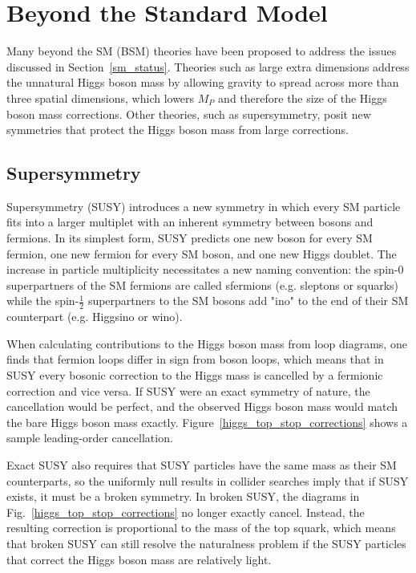 \section{Beyond the Standard Model}
Many beyond the SM (BSM) theories have been proposed to address the issues discussed in Section~\ref{sm_status}. Theories such as large extra dimensions address the unnatural Higgs boson mass by allowing gravity to spread across more than three spatial dimensions, which lowers $M_P$ and therefore the size of the Higgs boson mass corrections. Other theories, such as supersymmetry, posit new symmetries that protect the Higgs boson mass from large corrections. 

\subsection{Supersymmetry}
Supersymmetry (SUSY) introduces a new symmetry in which every SM particle fits into a larger multiplet with an inherent symmetry between bosons and fermions. In its simplest form, SUSY predicts one new boson for every SM fermion, one new fermion for every SM boson, and one new Higgs doublet. The increase in particle multiplicity necessitates a new naming convention: the spin-0 superpartners of the SM fermions are called sfermions (e.g. sleptons or squarks) while the spin-$\frac{1}{2}$ superpartners to the SM bosons add "ino" to the end of their SM counterpart (e.g. Higgsino or wino).

When calculating contributions to the Higgs boson mass from loop diagrams, one finds that fermion loops differ in sign from boson loops, which means that in SUSY every bosonic correction to the Higgs mass is cancelled by a fermionic correction and vice versa. If SUSY were an exact symmetry of nature, the cancellation would be perfect, and the observed Higgs boson mass would match the bare Higgs boson mass exactly. Figure~\ref{higgs_top_stop_corrections} shows a sample leading-order cancellation.



Exact SUSY also requires that SUSY particles have the same mass as their SM counterparts, so the uniformly null results in collider searches imply that if SUSY exists, it must be a broken symmetry. In broken SUSY, the diagrams in Fig.~\ref{higgs_top_stop_corrections} no longer exactly cancel. Instead, the resulting correction is proportional to the mass of the top squark, which means that broken SUSY can still resolve the naturalness problem if the SUSY particles that correct the Higgs boson mass are relatively light.

